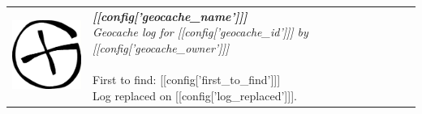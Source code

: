 \documentclass[a4paper]{report}
\begin{document}
\thispagestyle{empty}
\sffamily %
\setlength{\tabcolsep}{0ex} %
\setlength{\parindent}{0cm} %

\begin{tabular}{p{3cm} p{15cm}}
\vspace{0pt} %
\includegraphics[height=2.8cm,keepaspectratio]{logo}
& 
\vspace{0pt}
\parbox[t]{15cm}{ %
    \huge\emph{\textbf{[[config['geocache_name']]] }}
    \\
    \large\emph{ Geocache log for [[config['geocache_id']]] by [[config['geocache_owner']]]}
    \\
    \\
    \large First to find: [[config['first_to_find']]] 
    \\
    Log replaced on [[config['log_replaced']]].
}
\end{tabular}
\\
\\
\end{document}

